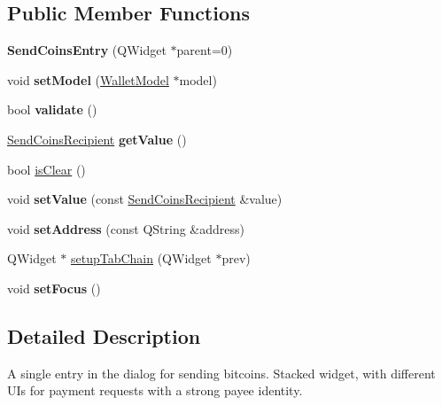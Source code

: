 \subsection*{Public Member Functions}
\begin{DoxyCompactItemize}
\item 
\mbox{\label{class_send_coins_entry_a1c385963cf2dd2eb618720908988d037}} 
{\bfseries Send\+Coins\+Entry} (Q\+Widget $\ast$parent=0)
\item 
\mbox{\label{class_send_coins_entry_a831f8f9a63acd77b7d66d5393e12310b}} 
void {\bfseries set\+Model} (\mbox{\hyperlink{class_wallet_model}{Wallet\+Model}} $\ast$model)
\item 
\mbox{\label{class_send_coins_entry_ab77df95fe77e9a001190cd4dabe0dfec}} 
bool {\bfseries validate} ()
\item 
\mbox{\label{class_send_coins_entry_af36fb0ed9e2e07079c1a982b31e793c8}} 
\mbox{\hyperlink{class_send_coins_recipient}{Send\+Coins\+Recipient}} {\bfseries get\+Value} ()
\item 
bool \mbox{\hyperlink{class_send_coins_entry_a1dcce9480364868dfd0bb8782e039e57}{is\+Clear}} ()
\item 
\mbox{\label{class_send_coins_entry_a513dd22231d0d7c2550c5533e9518cf5}} 
void {\bfseries set\+Value} (const \mbox{\hyperlink{class_send_coins_recipient}{Send\+Coins\+Recipient}} \&value)
\item 
\mbox{\label{class_send_coins_entry_a19aa4ce19ff25687203ac0790c241fee}} 
void {\bfseries set\+Address} (const Q\+String \&address)
\item 
Q\+Widget $\ast$ \mbox{\hyperlink{class_send_coins_entry_aa431a0bf53174b3a012fe224e472bc13}{setup\+Tab\+Chain}} (Q\+Widget $\ast$prev)
\item 
\mbox{\label{class_send_coins_entry_a0dcb8720f234165b37f8b45b035320cc}} 
void {\bfseries set\+Focus} ()
\end{DoxyCompactItemize}


\subsection{Detailed Description}
A single entry in the dialog for sending bitcoins. Stacked widget, with different U\+Is for payment requests with a strong payee identity. 

